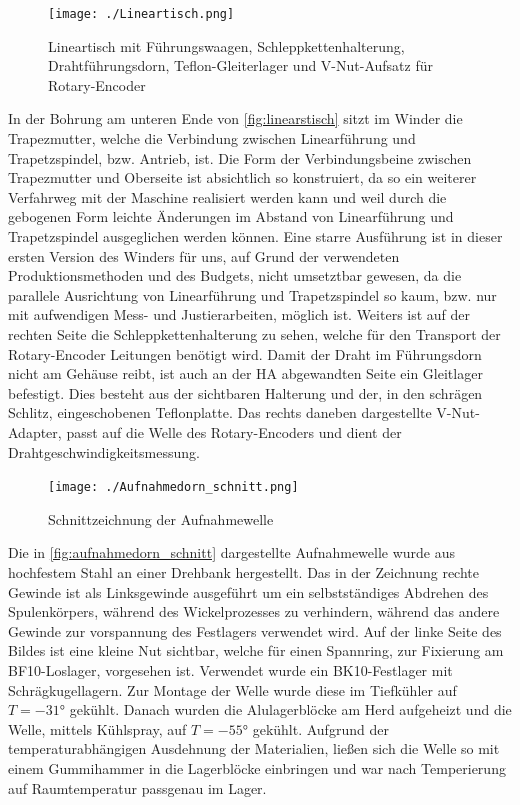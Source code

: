 \begin{figure}[H]
    \centering
    \texttt{[image: ./Lineartisch.png]}
    \caption{Lineartisch mit Führungswaagen, Schleppkettenhalterung, Drahtführungsdorn, Teflon-Gleiterlager und V-Nut-Aufsatz für Rotary-Encoder}
    \label{fig:linearstisch}
\end{figure}
In der Bohrung am unteren Ende von \autoref{fig:linearstisch} sitzt im Winder die Trapezmutter, welche die Verbindung zwischen Linearführung und Trapetzspindel, bzw. Antrieb, ist. Die Form der Verbindungsbeine zwischen Trapezmutter und Oberseite ist absichtlich so konstruiert, da so ein weiterer Verfahrweg mit der Maschine realisiert werden kann und weil durch die gebogenen Form leichte Änderungen im Abstand von Linearführung und Trapetzspindel ausgeglichen werden können. Eine starre Ausführung ist in dieser ersten Version des Winders für uns, auf Grund der verwendeten Produktionsmethoden und des Budgets, nicht umsetztbar gewesen, da die parallele Ausrichtung von Linearführung und Trapetzspindel so kaum, bzw. nur mit aufwendigen Mess- und Justierarbeiten, möglich ist. Weiters ist auf der rechten Seite die Schleppkettenhalterung zu sehen, welche für den Transport der Rotary-Encoder Leitungen benötigt wird. Damit der Draht im Führungsdorn nicht am Gehäuse reibt, ist auch an der HA abgewandten Seite ein Gleitlager befestigt. Dies besteht aus der sichtbaren Halterung und der, in den schrägen Schlitz, eingeschobenen Teflonplatte. Das rechts daneben dargestellte V-Nut-Adapter, passt auf die Welle des Rotary-Encoders und dient der Drahtgeschwindigkeitsmessung.



\begin{figure}[H]
    \centering
    \texttt{[image: ./Aufnahmedorn\_schnitt.png]}
    \caption{Schnittzeichnung der Aufnahmewelle}
    \label{fig:aufnahmedorn_schnitt}
\end{figure}

Die in \autoref{fig:aufnahmedorn_schnitt} dargestellte Aufnahmewelle wurde aus hochfestem Stahl an einer Drehbank hergestellt. Das in der Zeichnung rechte Gewinde ist als Linksgewinde ausgeführt um ein selbstständiges Abdrehen des Spulenkörpers, während des Wickelprozesses zu verhindern, während das andere Gewinde zur vorspannung des Festlagers verwendet wird. Auf der linke Seite des Bildes ist eine kleine Nut sichtbar, welche für einen Spannring, zur Fixierung am BF10-Loslager, vorgesehen ist. Verwendet wurde ein BK10-Festlager mit Schrägkugellagern. Zur Montage der Welle wurde diese im Tiefkühler auf $T = -31\si{\degree}$ gekühlt. Danach wurden die Alulagerblöcke am Herd aufgeheizt und die Welle, mittels Kühlspray, auf $T = -55\si{\degree}$ gekühlt. Aufgrund der temperaturabhängigen Ausdehnung der Materialien, ließen sich die Welle so mit einem Gummihammer in die Lagerblöcke einbringen und war nach Temperierung auf Raumtemperatur passgenau im Lager.

